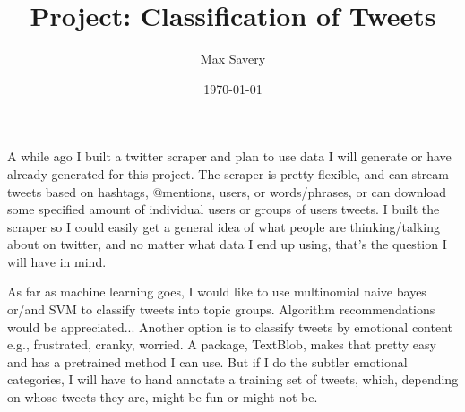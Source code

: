 \documentclass{article}
\title{Project: Classification of Tweets}
\author{Max Savery}
\date{\today}
\begin{document}
\setlength{\parskip}{1em}
\setlength{\parindent}{0pt}

\maketitle

A while ago I built a twitter scraper and plan to use data I will generate or have already generated for this project. The scraper is pretty flexible, and can stream tweets based on hashtags, @mentions, users, or words/phrases, or can download some specified amount of individual users or groups of users tweets. I built the scraper so I could easily get a general idea of what people are thinking/talking about on twitter, and no matter what data I end up using, that's the question I will have in mind.  

As far as machine learning goes, I would like to use multinomial naive bayes or/and SVM to classify tweets into topic groups. Algorithm recommendations would be appreciated... Another option is to classify tweets by emotional content e.g., frustrated, cranky, worried. A package, TextBlob, makes that pretty easy and has a pretrained method I can use. But if I do the subtler emotional categories, I will have to hand annotate a training set of tweets, which, depending on whose tweets they are, might be fun or might not be.   
\end{document}
